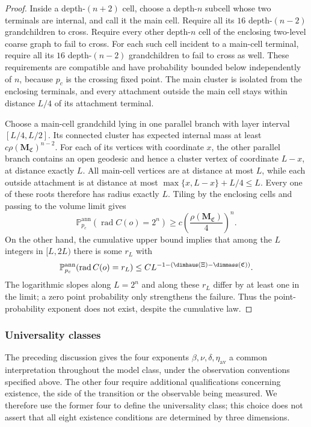 \begin{proof}
Inside a depth-$(n+2)$ cell, choose a depth-$n$ subcell whose two terminals are internal, and call it the main cell.
Require all its $16$ depth-$(n-2)$ grandchildren to cross.
Require every other depth-$n$ cell of the enclosing two-level coarse graph to fail to cross.
For each such cell incident to a main-cell terminal, require all its $16$ depth-$(n-2)$ grandchildren to fail to cross as well.
These requirements are compatible and have probability bounded below independently of $n$, because $p_c$ is the crossing fixed point.
The main cluster is isolated from the enclosing terminals, and every attachment outside the main cell stays within distance $L/4$ of its attachment terminal.

Choose a main-cell grandchild lying in one parallel branch with layer interval $[L/4,L/2]$.
Its connected cluster has expected internal mass at least $c\rho(\mathbf M_{\mathfrak C})^{n-2}$.
For each of its vertices with coordinate $x$, the other parallel branch contains an open geodesic and hence a cluster vertex of coordinate $L-x$, at distance exactly $L$.
All main-cell vertices are at distance at most $L$, while each outside attachment is at distance at most
$\max\{x,L-x\}+L/4\le L$.
Every one of these roots therefore has radius exactly $L$.
Tiling by the enclosing cells and passing to the volume limit gives
\begin{equation}\label{eq:diamond-radius-spikes}
 \mathbb P_{p_c}^{\mathrm{ann}}(\operatorname{rad}C(o)=2^n)
 \ge c\left(\frac{\rho(\mathbf M_{\mathfrak C})}{4}\right)^n.
\end{equation}
On the other hand, the cumulative upper bound implies that among the $L$ integers in $[L,2L)$ there is some $r_L$ with
\[
 \mathbb P_{p_c}^{\mathrm{ann}}(\operatorname{rad}C(o)=r_L)
 \le CL^{-1-(\dimhaus(\Xi)-\dimmass(\mathfrak C))}.
\]
The logarithmic slopes along $L=2^n$ and along these $r_L$ differ by at least one in the limit; a zero point probability only strengthens the failure.
Thus the point-probability exponent does not exist, despite the cumulative law.
\end{proof}


\subsubsection*{Universality classes}
The preceding discussion gives the four exponents $\beta,\nu,\delta,\eta_{\mathrm{av}}$ a common interpretation throughout the model class, under the observation conventions specified above.
The other four require additional qualifications concerning existence, the side of the transition or the observable being measured.
We therefore use the former four to define the universality class; this choice does not assert that all eight existence conditions are determined by three dimensions.

